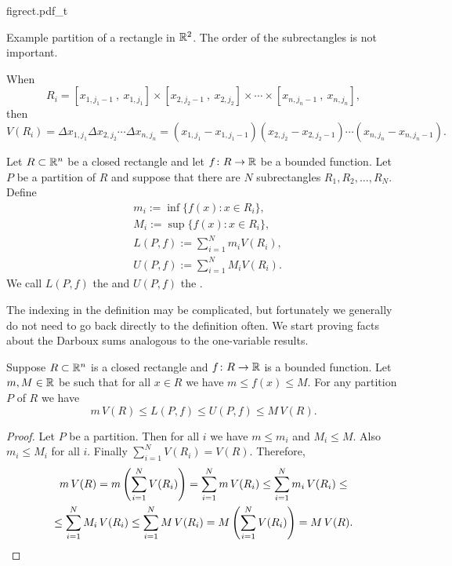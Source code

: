 \begin{defn}
\begin{myfigureht}
{figrect.pdf_t}
\caption{Example partition of a rectangle in ${\mathbb{R}}^2$.  The order of the
subrectangles is not important.\label{mv:figrect}}
\end{myfigureht}

When
\begin{equation*}
R_i = [x_{1,j_1-1}~,~ x_{1,j_1}]
\times
[x_{2,j_2-1}~,~ x_{2,j_2}]
\times
\cdots
\times
[x_{n,j_n-1}~,~ x_{n,j_n}] ,
\end{equation*}
then
\begin{equation*}
V(R_i) = 
\Delta x_{1,j_1}
\Delta x_{2,j_2}
\cdots
\Delta x_{n,j_n}
=
(x_{1,j_1}-x_{1,j_1-1})
(x_{2,j_2}-x_{2,j_2-1})
\cdots
(x_{n,j_n}-x_{n,j_n-1}) .
\end{equation*}

Let $R \subset {\mathbb{R}}^n$ be a closed rectangle and
let $f \colon R \to {\mathbb{R}}$ be a bounded function.  Let $P$ be a partition of
$R$ and suppose that there are $N$ subrectangles $R_1,R_2,\ldots,R_N$.
Define
\begin{align*}
& m_i := \inf \bigl\{ f(x) : x \in R_i \bigr\} , \\
& M_i := \sup \bigl\{ f(x) : x \in R_i \bigr\} , \\
& L(P,f) :=
\sum_{i=1}^N m_i V(R_i) , \\
& U(P,f) :=
\sum_{i=1}^N M_i V(R_i) .
\end{align*}
We call $L(P,f)$ the \emph{} and
$U(P,f)$ the \emph{}.
\end{defn}

The indexing in the definition may be complicated, but fortunately we generally
do not need to go back directly to the definition often.
We start proving facts about the Darboux sums analogous to the one-variable
results.

\begin{prop} \label{mv:sumulbound:prop}
Suppose $R \subset {\mathbb{R}}^n$ is a closed rectangle
and $f \colon R \to {\mathbb{R}}$ is a bounded function.  Let $m, M \in {\mathbb{R}}$ be 
such that for all $x \in R$ we have $m \leq f(x) \leq M$.  For any partition
$P$ of $R$
we have
\begin{equation*}
m \, V(R) \leq
L(P,f) \leq U(P,f)
\leq M\, V(R) .
\end{equation*}
\end{prop}

\begin{proof}
Let $P$ be a partition.  Then for all $i$ we have
$m \leq m_i$ and $M_i \leq M$.  Also $m_i \leq M_i$ for all $i$.  Finally
$\sum_{i=1}^N V(R_i) = V(R)$.  Therefore,
\begin{multline*}
m \, V(R) =
m \left( \sum_{i=1}^N V(R_i) \right)
=
\sum_{i=1}^N m \, V(R_i)
\leq
\sum_{i=1}^N m_i \, V(R_i)
\leq
\\
\leq
\sum_{i=1}^N M_i \, V(R_i)
\leq
\sum_{i=1}^N M \,V(R_i)
=
M \left( \sum_{i=1}^N V(R_i) \right)
=
M \,V(R) .  \qedhere
\end{multline*}
\end{proof}

